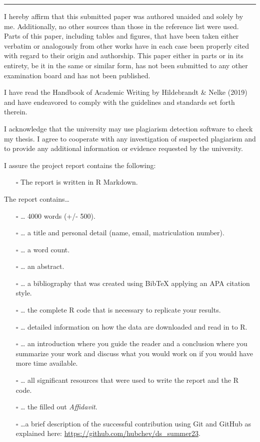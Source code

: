 \documentclass[
  12pt,
]{article}
\providecommand{\tightlist}{%
  \setlength{\itemsep}{0pt}\setlength{\parskip}{0pt}}
\begin{document}
\begin{center}\rule{0.5\linewidth}{0.5pt}\end{center}

I hereby affirm that this submitted paper was authored unaided and
solely by me. Additionally, no other sources than those in the reference
list were used. Parts of this paper, including tables and figures, that
have been taken either verbatim or analogously from other works have in
each case been properly cited with regard to their origin and
authorship. This paper either in parts or in its entirety, be it in the
same or similar form, has not been submitted to any other examination
board and has not been published.

I have read the Handbook of Academic Writing by Hildebrandt \& Nelke (2019) and
have endeavored to comply with the guidelines and standards set forth
therein.

I acknowledge that the university may use plagiarism detection software
to check my thesis. I agree to cooperate with any investigation of
suspected plagiarism and to provide any additional information or
evidence requested by the university.

I assure the project report contains the following:

\begin{itemize}
\tightlist
\item[$\square$]
  The report is written in R Markdown.
\end{itemize}

The report contains\ldots{}

\begin{itemize}
\item[$\square$]
  \ldots{} 4000 words (+/- 500).
\item[$\square$]
  \ldots{} a title and personal detail (name, email, matriculation
  number).
\item[$\square$]
  \ldots{} a word count.
\item[$\square$]
  \ldots{} an abstract.
\item[$\square$]
  \ldots{} a bibliography that was created using BibTeX applying an APA
  citation style.
\item[$\square$]
  \ldots{} the complete R code that is necessary to replicate your
  results.
\item[$\square$]
  \ldots{} detailed information on how the data are downloaded and read
  in to R.
\item[$\square$]
  \ldots{} an introduction where you guide the reader and a conclusion
  where you summarize your work and discuss what you would work on if
  you would have more time available.
\item[$\square$]
  \ldots{} all significant resources that were used to write the report
  and the R code.
\item[$\square$]
  \ldots{} the filled out \emph{Affidavit}.
\item[$\square$]
  \ldots a brief description of the successful contribution using Git and GitHub as explained here: \url{https://github.com/hubchev/ds_summer23}.
\end{itemize}
\end{document}
